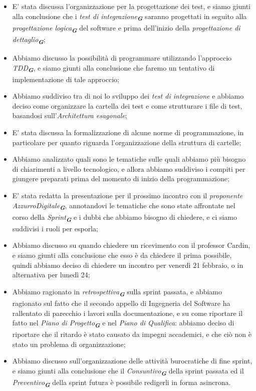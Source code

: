 \begin{itemize}
    \item E' stata discussa l'organizzazione per la progettazione dei test, e siamo giunti alla conclusione che i
    \emph{test di integrazione}\textsubscript{\textit{\textbf{G}}} saranno progettati in seguito alla
    \emph{progettazione logica}\textsubscript{\textit{\textbf{G}}} del software e prima dell'inizio della
    \emph{progettazione di dettaglio}\textsubscript{\textit{\textbf{G}}};
    \item Abbiamo discusso la possibilità di programmare utilizzando l'approccio \emph{TDD}\textsubscript{\textit{\textbf{G}}}, e
    siamo giunti alla conclusione che faremo un tentativo di implementazione di tale approccio;
    \item Abbiamo suddiviso tra di noi lo sviluppo dei \emph{test di integrazione} e abbiamo deciso come organizzare la cartella dei
    test e come strutturare i file di test, basandosi sull'\emph{Architettura esagonale};
    \item E' stata discussa la formalizzazione di alcune norme di programmazione, in particolare per quanto riguarda l'organizzazione
    della struttura di cartelle;
    \item Abbiamo analizzato quali sono le tematiche sulle quali abbiamo più bisogno di chiarimenti a livello tecnologico, e allora
    abbiamo suddiviso i compiti per giungere preparati prima del momento di inizio della programmazione;
    \item E' stata redatta la presentazione per il prossimo incontro con il \emph{proponente}
    \emph{AzzurroDigitale}\textsubscript{\textit{\textbf{G}}}, annotandovi le tematiche che sono state affrontate nel corso della
    \emph{Sprint}\textsubscript{\textit{\textbf{G}}} e i dubbi che abbiamo bisogno di chiedere, e ci siamo suddivisi i ruoli per esporla;
    \item Abbiamo discusso su quando chiedere un ricevimento con il professor Cardin, e siamo giunti alla conclusione che esso è da
    chiedere il prima possibile, quindi abbiamo deciso di chiedere un incontro per venerdì 21 febbraio, o in alternativa per lunedì 24;
    \item Abbiamo ragionato in \emph{retrospettiva}\textsubscript{\textit{\textbf{G}}} sulla sprint passata, e abbiamo ragionato sul
    fatto che il secondo appello di Ingegneria del Software ha rallentato di parecchio i lavori sulla documentazione, e su come
    riportare il fatto nel \emph{Piano di Progetto}\textsubscript{\textit{\textbf{G}}} e nel \emph{Piano di Qualifica}: abbiamo deciso
    di riportare che il ritardo è stato causato da impegni accademici, e che ciò non è stato un problema di organizzazione;
    \item Abbiamo discusso sull'organizzazione delle attività burocratiche di fine sprint, e siamo giunti alla conclusione che il
    \emph{Consuntivo}\textsubscript{\textit{\textbf{G}}} della sprint passata ed il \emph{Preventivo}\textsubscript{\textit{\textbf{G}}}
    della sprint futura è possibile redigerli in forma asincrona.
    
 \end{itemize}
